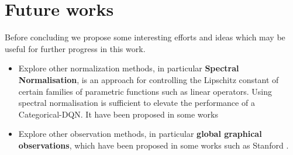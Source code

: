 \section{Future works}
Before concluding we propose some interesting efforts and ideas which may be useful for further progress in this work.
\begin{itemize}
	\item Explore other normalization methods, in particular \textbf{Spectral Normalisation},  is an approach for controlling the Lipschitz constant of certain families of parametric functions such as linear operators. Using spectral normalisation is sufficient to elevate the performance of a Categorical-DQN.
	It have been proposed in some works \cite{spectralNorma}
	\item Explore other observation methods, in particular \textbf{global graphical observations}, which have been proposed in some works such as Stanford \cite{graphiObserv}.
\end{itemize}

